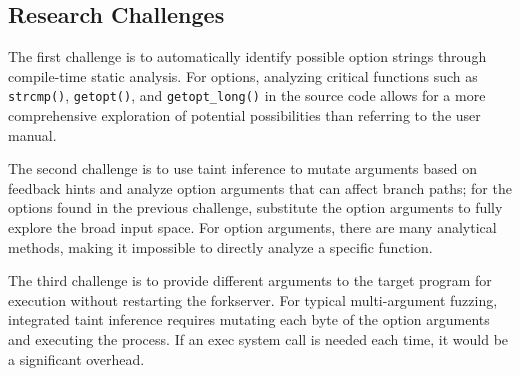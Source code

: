 \fi

\subsection{Research Challenges} %

The first challenge is to automatically identify possible option strings through compile-time static analysis. For options, analyzing critical functions such as \texttt{strcmp()}, \texttt{getopt()}, and \texttt{getopt\_long()} in the source code allows for a more comprehensive exploration of potential possibilities than referring to the user manual.

The second challenge is to use taint inference to mutate arguments based on feedback hints and analyze option arguments that can affect branch paths; for the options found in the previous challenge, substitute the option arguments to fully explore the broad input space. For option arguments, there are many analytical methods, making it impossible to directly analyze a specific function. 

The third challenge is to provide different arguments to the target program for execution without restarting the forkserver. For typical multi-argument fuzzing, integrated taint inference requires mutating each byte of the option arguments and executing the process. If an exec system call is needed each time, it would be a significant overhead. 
